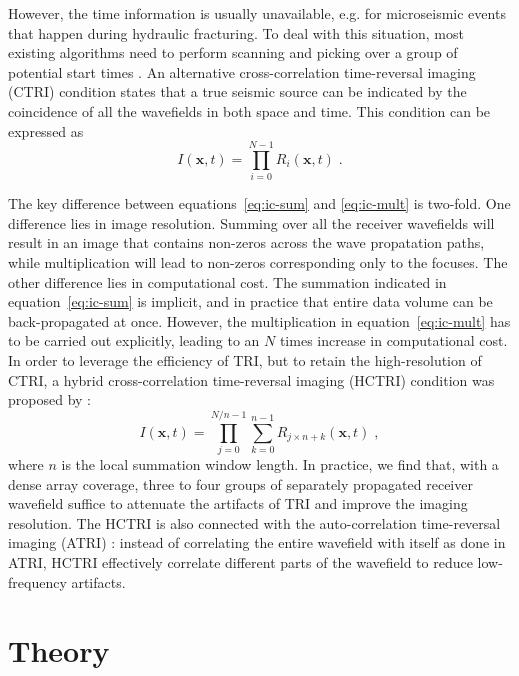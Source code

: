 However, the time information is usually unavailable, e.g. for microseismic events that happen during hydraulic fracturing. To deal with this situation, most existing algorithms need to perform scanning and picking over a group of potential start times \cite[]{fink2006time,maxwellbook}. An alternative cross-correla\-tion time-reversal imaging (CTRI) condition states that a true seismic source can be indicated by the coincidence of all the wavefields in both space and time. This condition can be expressed as \cite[]{meabs15a,nakata16}
\begin{equation}
\label{eq:ic-mult}
I(\mathbf{x},t) = \prod\limits_{i=0}^{N-1} R_i(\mathbf{x},t) \; .
\end{equation}

The key difference between equations~\ref{eq:ic-sum} and \ref{eq:ic-mult} is two-fold. One difference lies in image resolution. Summing over all the receiver wavefields will result in an image that contains non-zeros across the wave propatation paths, while multiplication will lead to non-zeros corresponding only to the focuses. The other difference lies in computational cost. The summation indicated in equation~\ref{eq:ic-sum} is implicit, and in practice that entire data volume can be back-propagated at once. However, the multiplication in equation~\ref{eq:ic-mult} has to be carried out explicitly, leading to an $N$ times increase in computational cost. In order to leverage the efficiency of TRI, but to retain the high-resolution of CTRI, a hybrid cross-correlation time-reversal imaging (HCTRI) condition was proposed by \cite{meabs15a}:
\begin{equation}
\label{eq:ic-hyb}
I(\mathbf{x},t) = \prod\limits_{j=0}^{N/n-1} \sum\limits_{k=0}^{n-1} R_{j \times n+k}(\mathbf{x},t) \; ,
\end{equation}
where $n$ is the local summation window length. In practice, we find that, with a dense array coverage, three to four groups of separately propagated receiver wavefield suffice to attenuate the artifacts of TRI and improve the imaging resolution. The HCTRI is also connected with the auto-correlation time-reversal imaging (ATRI) \cite[]{atm10}: instead of correlating the entire wavefield with itself as done in ATRI, HCTRI effectively correlate different parts of the wavefield to reduce low-frequency artifacts.

\section{Theory}

